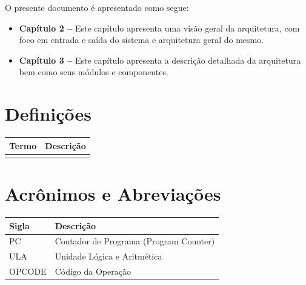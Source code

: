 \documentclass{report}
\begin{document}
O presente documento é apresentado como segue:\\

  \begin{itemize}
   \item \textbf{Capítulo 2 --} Este capítulo apresenta uma visão geral da arquitetura, com foco em entrada e saída do sistema e arquitetura geral do mesmo.
   \item \textbf{Capítulo 3 --} Este capítulo apresenta a descrição detalhada da arquitetura bem como seus módulos e componentes.
  \end{itemize}


  \section{Definições}
    \FloatBarrier
    \begin{table}[H]
      \begin{center}
        \begin{tabular}[pos]{|m{5cm} | m{9cm}|} 
          \hline
          \cellcolor[gray]{0.9}\textbf{Termo} & \cellcolor[gray]{0.9}\textbf{Descrição} \\ \hline
                          &                       \\ \hline
        \end{tabular}
      \end{center}
    \end{table}  

  \section{Acrônimos e Abreviações}
    \FloatBarrier
    \begin{table}[H]
      \begin{center}
        \begin{tabular}[pos]{|m{2cm} | m{12cm}|} 
          \hline
          \cellcolor[gray]{0.9}\textbf{Sigla} & \cellcolor[gray]{0.9}\textbf{Descrição} \\ \hline
             PC       &  Contador de Programa (Program Counter)\\ \hline
             ULA      &  Unidade Lógica e Aritmética\\ \hline
             OPCODE   &  Código da Operação\\ \hline
        \end{tabular}
      \end{center}
    \end{table}  
\end{document}
